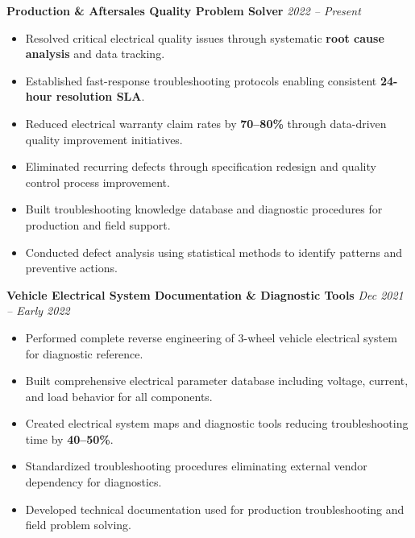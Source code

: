 \documentclass[a4paper,10pt]{article}
\begin{document}
\textbf{Production \& Aftersales Quality Problem Solver} \hfill \textit{2022 – Present}
\begin{itemize}
    \item Resolved critical electrical quality issues through systematic \textbf{root cause analysis} and data tracking.
    \item Established fast-response troubleshooting protocols enabling consistent \textbf{24-hour resolution SLA}.
    \item Reduced electrical warranty claim rates by \textbf{70–80\%} through data-driven quality improvement initiatives.
    \item Eliminated recurring defects through specification redesign and quality control process improvement.
    \item Built troubleshooting knowledge database and diagnostic procedures for production and field support.
    \item Conducted defect analysis using statistical methods to identify patterns and preventive actions.
\end{itemize}

\vspace{6pt}

\textbf{Vehicle Electrical System Documentation \& Diagnostic Tools} \hfill \textit{Dec 2021 – Early 2022}
\begin{itemize}
    \item Performed complete reverse engineering of 3-wheel vehicle electrical system for diagnostic reference.
    \item Built comprehensive electrical parameter database including voltage, current, and load behavior for all components.
    \item Created electrical system maps and diagnostic tools reducing troubleshooting time by \textbf{40–50\%}.
    \item Standardized troubleshooting procedures eliminating external vendor dependency for diagnostics.
    \item Developed technical documentation used for production troubleshooting and field problem solving.
\end{itemize}

\end{document}
